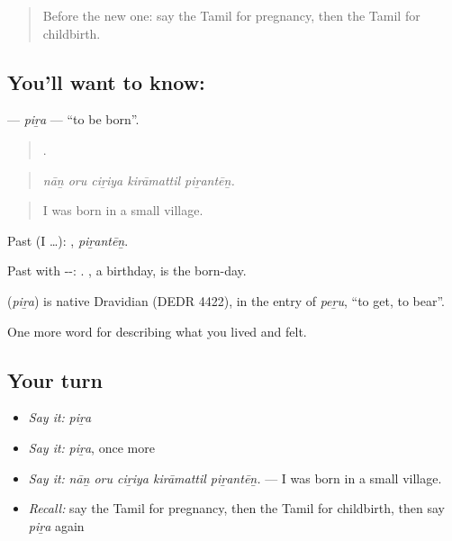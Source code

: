 \label{lesson:TA-C496-pira}



\begin{quote}
Before the new one: say the Tamil for pregnancy, then the Tamil for childbirth.
\end{quote}

\subsection*{You'll want to know: }
\textbf{} — \emph{piṟa} — \textquotedblleft{}to be born\textquotedblright{}.

\begin{quote}
    .
\end{quote}

\begin{quote}
\emph{nāṉ oru ciṟiya kirāmattil piṟantēṉ.}
\end{quote}

\begin{quote}
I was born in a small village.
\end{quote}

Past (I …): , \emph{piṟantēṉ}.

Past with --: . , a birthday, is the born-day.

\begin{cousinweb}
\textbf{} (\emph{piṟa}) is native Dravidian (DEDR 4422), in the entry of  \emph{peṟu}, \textquotedblleft{}to get, to bear\textquotedblright{}.
\end{cousinweb}

\begin{grammarlens}[title={What you've built}]
One more word for describing what you lived and felt.
\end{grammarlens}

\subsection*{Your turn}
\begin{itemize}
\raggedright
  \item \emph{Say it:} \emph{piṟa}
  \item \emph{Say it:} \emph{piṟa}, once more
  \item \emph{Say it:} \emph{nāṉ oru ciṟiya kirāmattil piṟantēṉ.} — I was born in a small village.
  \item \emph{Recall:} say the Tamil for pregnancy, then the Tamil for childbirth, then say \emph{piṟa} again
\end{itemize}

